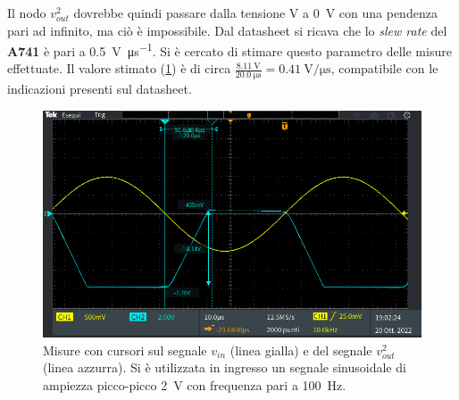 Il nodo $v_{out}^2$ dovrebbe quindi passare dalla tensione V a \SI{0}{\volt} con una pendenza pari ad infinito, ma ciò è impossibile. Dal datasheet si ricava che lo \textit{slew rate} del \textbf{\textmu A741} è pari a \SI{0.5}{\volt\per\micro\second}. Si è cercato di stimare questo parametro delle misure effettuate. Il valore stimato (\Fig\ref{fig:slew_rate_circuito_1}) è di circa $\frac{\SI{8.11}{\volt}}{\SI{20.0}{\micro\second}}=\SI{0.41}{\volt\per\micro\second}$, compatibile con le indicazioni presenti sul datasheet.
\begin{figure}[h]
	\centering
	\includegraphics[width=\linewidth]{./ImageFiles/Laboratorio 3/TEK00006.PNG}
	\caption{Misure con cursori sul segnale $v_{in}$ (linea gialla) e del segnale $v_{out}^2$ (linea azzurra). Si è utilizzata in ingresso un segnale sinusoidale di ampiezza picco-picco \SI{2}{\volt} con frequenza pari a \SI{100}{\hertz}.}
	\label{fig:slew_rate_circuito_1}
\end{figure}

